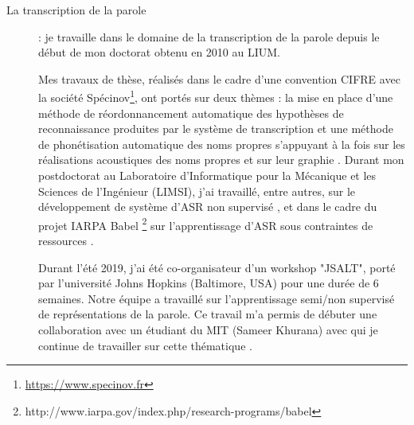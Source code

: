 \documentclass[11pt,a4paper]{article}
\begin{document}
\begin{description}
	\item[La transcription de la parole] : je travaille dans le domaine de la transcription de la parole depuis le début de mon doctorat obtenu en 2010 au LIUM. 
	
	Mes travaux de thèse, réalisés dans le cadre d'une convention CIFRE avec la société Spécinov\footnote{\url{https://www.specinov.fr}}, ont portés sur deux thèmes : la mise en place d'une méthode de réordonnancement automatique des hypothèses de reconnaissance produites par le système de transcription \cite{Laurent11} et une méthode de phonétisation automatique des noms propres s'appuyant à la fois sur les réalisations acoustiques des noms propres et sur leur graphie \cite{Laurent14c,Laurent10-b,Laurent09b,Laurent09,Laurent08}.
	Durant mon postdoctorat au Laboratoire d’Informatique pour la Mécanique et les Sciences de l’Ingénieur (LIMSI), j'ai travaillé, entre autres, sur le développement de système d'ASR non supervisé \cite{Laurent14d}, et dans le cadre du projet IARPA Babel \footnote{http://www.iarpa.gov/index.php/research-programs/babel} sur l'apprentissage d'ASR sous contraintes de ressources \cite{Fraga15b, Laurent16}.
	
	Durant l'été 2019, j'ai été co-organisateur d'un workshop "JSALT", porté par l'université Johns Hopkins (Baltimore, USA) pour une durée de 6 semaines. Notre équipe a travaillé sur l'apprentissage semi/non supervisé de représentations de la parole. Ce travail m'a permis de débuter une collaboration avec un étudiant du MIT (Sameer Khurana) avec qui je continue de travailler sur cette thématique \cite{chorowski19, dolfing20, lancucki20, khurana20b, khurana20}.
\end{description}
\end{document}
